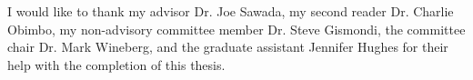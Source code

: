 \documentclass[11pt,dvipsnames]{gthesis}
\begin{document}

\begin{frontmatter}

\begin{acknowledgements}

	I would like to thank my advisor Dr. Joe Sawada, my second reader Dr. Charlie Obimbo, my non-advisory committee member Dr. Steve 
	Gismondi, the committee chair Dr. Mark Wineberg, and the graduate assistant Jennifer Hughes for their help with the completion 
	of this thesis. 
\end{acknowledgements}




\tableofcontents
\listoftables
\listoffigures

\end{frontmatter}

\dsp


\ssp
  
  
\dsp


\appendix

\end{document}
